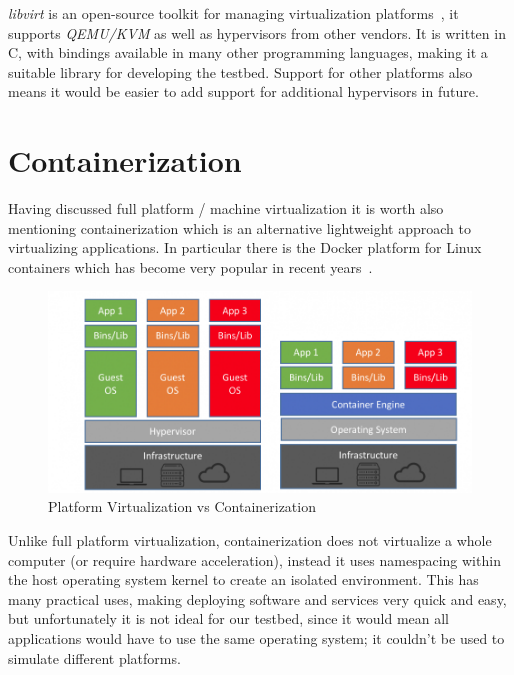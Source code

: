 \documentclass[
    author={Jacob Daniel Halsey},
    supervisor={Prof. Awais Rashid},
    degree={BSc},
    title={Building a Testbed for Evaluating Privacy Enhancing Technologies  (PETs)},
    subtitle={},
    type={software development},
    year={2021}
]{dissertation}
\begin{document}
\emph{libvirt} is an open-source toolkit for managing virtualization platforms~\cite{libvirt},
it supports \emph{QEMU/KVM} as well as hypervisors from other vendors. It is written in C, 
with bindings available in many other programming languages, making it a suitable library for developing 
the testbed. Support for other platforms also means it would be easier to add support
for additional hypervisors in future.

\section{Containerization}
\label{sect:containerization}

Having discussed full platform / machine virtualization it is worth also mentioning containerization
which is an alternative lightweight approach to virtualizing applications. In particular 
there is the Docker platform for Linux containers which has become very popular in recent
years~\cite{zdnet_docker_2018}. \\

\begin{figure}
	\centering
	\includegraphics[width=12cm]{img/containers}
	\caption[]{Platform Virtualization vs Containerization\footnotemark}
	\label{containers_diagram}
\end{figure}

Unlike full platform virtualization, containerization does not virtualize a whole computer 
(or require hardware acceleration), instead it uses namespacing within the host operating 
system kernel to create an isolated environment. This has many practical uses, making deploying
software and services very quick and easy, but unfortunately it is not ideal for our testbed, since
it would mean all applications would have to use the same operating system; it couldn't be 
used to simulate different platforms. \\
\end{document}
